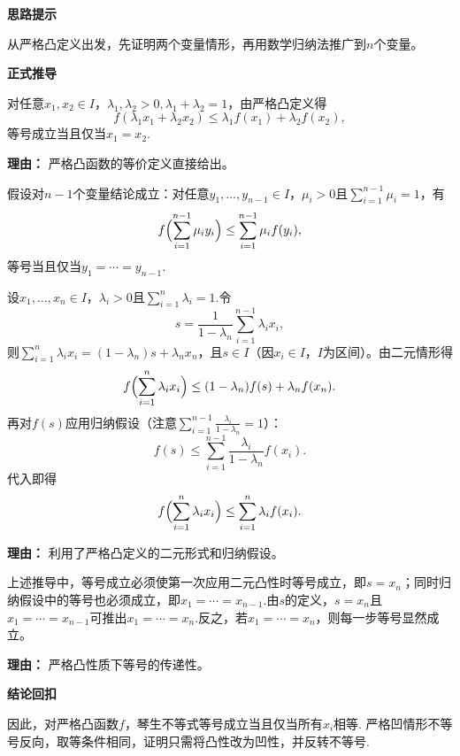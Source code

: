 \begin{proofbox}
	\textbf{\textcolor{CProof}{思路提示}}

	从严格凸定义出发，先证明两个变量情形，再用数学归纳法推广到$n$个变量。

	\medskip
	\textbf{\textcolor{CProof}{正式推导}}
	\begin{description}[style=nextline, leftmargin=2.8em, labelsep=0.5em, itemsep=0.55em]
		\item[\textbf{步骤一（二元情形）：}] 对任意$x_1,x_2\in I$，$\lambda_1,\lambda_2>0,\lambda_1+\lambda_2=1$，由严格凸定义得
			\[
				f(\lambda_1x_1+\lambda_2x_2)\le\lambda_1f(x_1)+\lambda_2f(x_2),
			\]
			等号成立当且仅当$x_1=x_2$.
			\par\textbf{理由：} 严格凸函数的等价定义直接给出。

		\item[\textbf{步骤二（归纳假设）：}] 假设对$n-1$个变量结论成立：对任意$y_1,\dots,y_{n-1}\in I$，$\mu_i>0$且$\sum_{i=1}^{n-1}\mu_i=1$，有
			\[
				f\Bigl(\sum_{i=1}^{n-1}\mu_i y_i\Bigr)\le\sum_{i=1}^{n-1}\mu_i f(y_i),
			\]
			等号当且仅当$y_1=\cdots=y_{n-1}$.

		\item[\textbf{步骤三（推广到$n$个变量）：}] 设$x_1,\dots,x_n\in I$，$\lambda_i>0$且$\sum_{i=1}^n\lambda_i=1$.令
			\[
				s=\frac{1}{1-\lambda_n}\sum_{i=1}^{n-1}\lambda_i x_i,
			\]
			则$\sum_{i=1}^n\lambda_i x_i=(1-\lambda_n)s+\lambda_n x_n$，且$s\in I$（因$x_i\in I$，$I$为区间）。由二元情形得
			\[
				f\Bigl(\sum_{i=1}^n\lambda_i x_i\Bigr)\le(1-\lambda_n)f(s)+\lambda_n f(x_n).
			\]
			再对$f(s)$应用归纳假设（注意$\sum_{i=1}^{n-1}\frac{\lambda_i}{1-\lambda_n}=1$）：
			\[
				f(s)\le\sum_{i=1}^{n-1}\frac{\lambda_i}{1-\lambda_n}f(x_i).
			\]
			代入即得
			\[
				f\Bigl(\sum_{i=1}^n\lambda_i x_i\Bigr)\le\sum_{i=1}^n\lambda_i f(x_i).
			\]
			\par\textbf{理由：} 利用了严格凸定义的二元形式和归纳假设。

		\item[\textbf{步骤四（取等条件分析）：}] 上述推导中，等号成立必须使第一次应用二元凸性时等号成立，即$s=x_n$；同时归纳假设中的等号也必须成立，即$x_1=\cdots=x_{n-1}$.由$s$的定义，$s=x_n$且$x_1=\cdots=x_{n-1}$可推出$x_1=\cdots=x_n$.反之，若$x_1=\cdots=x_n$，则每一步等号显然成立。
			\par\textbf{理由：} 严格凸性质下等号的传递性。
	\end{description}

	\medskip
	\textbf{\textcolor{CProof}{结论回扣}}

	因此，对严格凸函数$f$，琴生不等式等号成立当且仅当所有$x_i$相等. 严格凹情形不等号反向，取等条件相同，证明只需将凸性改为凹性，并反转不等号.
\end{proofbox}
